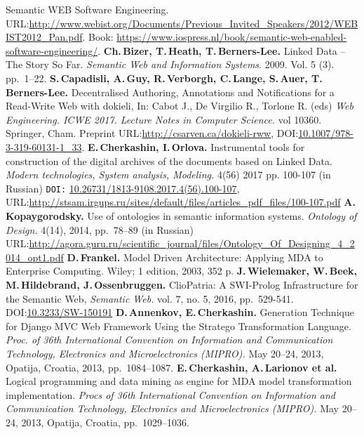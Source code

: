 \documentclass[runningheads]{llncs}
\begin{document}
\begin{thebibliography}{11}
 Semantic WEB Software Engineering. URL:\url{http://www.webist.org/Documents/Previous\_Invited\_Speakers/2012/WEBIST2012\_Pan.pdf}. Book: \url{https://www.iospress.nl/book/semantic-web-enabled-software-engineering/}.
 \textbf{Ch.\,Bizer, T.\,Heath, T.\,Berners-Lee.} Linked Data -- The Story So Far. \emph{Semantic Web and Information Systems}. 2009. Vol. 5 (3). pp.~1--22.
 \textbf{S.\,Capadisli, A.\,Guy, R.\,Verborgh, C.\,Lange, S.\,Auer, T.\,Berners-Lee.} Decentralised Authoring, Annotations and Notifications for a Read-Write Web with dokieli, In: Cabot J., De Virgilio R., Torlone R. (eds) \emph{Web Engineering. ICWE 2017. Lecture Notes in Computer Science.} vol 10360. Springer, Cham. Preprint URL:\url{http://csarven.ca/dokieli-rww}, DOI:\url{10.1007/978-3-319-60131-1_33}.
 \textbf{E.\,Cherkashin, I.\,Orlova.} Instrumental tools for construction of the digital archives of the documents based on Linked Data. \emph{Modern technologies, System analysis, Modeling.} 4(56) 2017 pp. 100-107 (in Russian) \texttt{DOI:} \url{10.26731/1813-9108.2017.4(56).100-107}, URL:\url{http://stsam.irgups.ru/sites/default/files/articles\_pdf\_files/100-107.pdf}
 \textbf{A.\,Kopaygorodsky.} Use of ontologies in semantic information systems. \emph{Ontology of Design.} 4(14), 2014, pp.~78--89 (in Russian) URL:\href{http://agora.guru.ru/scientific_journal/files/Ontology_Of_Designing_4_2014_opt1.pdf#page=79}{\ttfamily http://agora.guru.ru/scientific\_journal/files/On\-tology\_Of\_Designing\_4\_2014\_opt1.pdf}
 \textbf{D.\,Frankel.} Model Driven Architecture: Applying MDA to Enterprise Computing. Wiley; 1 edition, 2003, 352 p.
 \textbf{J.\,Wielemaker, W.\,Beek, M.\,Hildebrand, J.\,Ossenbruggen.} ClioPatria: A SWI-Prolog Infrastructure for the Semantic Web, \emph{Semantic Web.} vol. 7, no. 5, 2016, pp.~529-541. DOI:\url{10.3233/SW-150191}
 \textbf{D.\,Annenkov, E.\,Cherkashin.} Generation Technique for Django MVC Web Framework Using the Stratego Transformation Language. \emph{Proc. of 36th International Convention on Information and Communication Technology, Electronics and Microelectronics (MIPRO).} May 20--24, 2013, Opatija, Croatia, 2013, pp.~1084--1087.
 \textbf{E.\,Cherkashin, A.\,Larionov et al.} Logical programming and data mining as engine for MDA model transformation implementation. \emph{Procs of 36th International Convention on Information and Communication Technology, Electronics and Microelectronics (MIPRO).} May 20--24, 2013, Opatija, Croatia, pp.~1029--1036.

\end{thebibliography}
\end{document}
